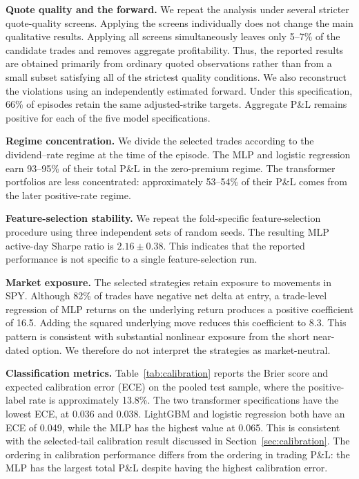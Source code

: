 \documentclass[sigconf,review,anonymous]{acmart}
\begin{document}
\noindent\textbf{Quote quality and the forward.}
We repeat the analysis under several stricter quote-quality screens. Applying the screens individually does not change the main qualitative results. Applying all screens simultaneously leaves only 5--7\% of the candidate trades and removes aggregate profitability. Thus, the reported results are obtained primarily from ordinary quoted observations rather than from a small subset satisfying all of the strictest quality conditions.
We also reconstruct the violations using an independently estimated forward. Under this specification, 66\% of episodes retain the same adjusted-strike targets. Aggregate P\&L remains positive for each of the five model specifications.

\noindent\textbf{Regime concentration.}
We divide the selected trades according to the dividend--rate regime at the time of the episode. The MLP and logistic regression earn 93--95\% of their total P\&L in the zero-premium regime. The transformer portfolios are less concentrated: approximately 53--54\% of their P\&L comes from the later positive-rate regime.

\noindent\textbf{Feature-selection stability.}
We repeat the fold-specific feature-selection procedure using three independent sets of random seeds. The resulting MLP active-day Sharpe ratio is $2.16\pm0.38$. This indicates that the reported performance is not specific to a single feature-selection run.

\noindent\textbf{Market exposure.}
The selected strategies retain exposure to movements in SPY. Although 82\% of trades have negative net delta at entry, a trade-level regression of MLP returns on the underlying return produces a positive coefficient of 16.5. Adding the squared underlying move reduces this coefficient to 8.3. This pattern is consistent with substantial nonlinear exposure from the short near-dated option. We therefore do not interpret the strategies as market-neutral.

\noindent\textbf{Classification metrics.}
Table~\ref{tab:calibration} reports the Brier score and expected calibration error (ECE) on the pooled test sample, where the positive-label rate is approximately 13.8\%. The two transformer specifications have the lowest ECE, at 0.036 and 0.038. LightGBM and logistic regression both have an ECE of 0.049, while the MLP has the highest value at 0.065. This is consistent with the selected-tail calibration result discussed in Section~\ref{sec:calibration}. The ordering in calibration performance differs from the ordering in trading P\&L: the MLP has the largest total P\&L despite having the highest calibration error.
\end{document}
